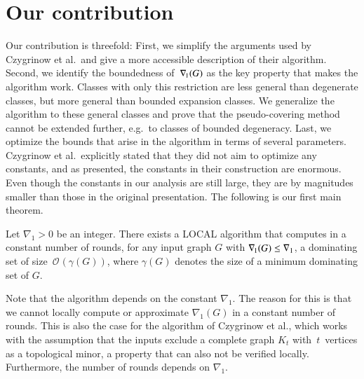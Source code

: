 \section{Our contribution}
Our contribution is threefold:
First, we simplify the
arguments used by Czygrinow et al.\ and give a  more accessible
description of their algorithm.
Second, we identify the boundedness of~$\nabla_{\hspace{-1pt}1}(G)$ as the key property that makes the algorithm
work. Classes with only this restriction are less general than degenerate classes, but
 more general than bounded expansion classes.
 We generalize the algorithm to these general classes
 and prove that the pseudo-covering method cannot
be extended further, e.g.\ to classes of bounded degeneracy.
Last, we optimize the bounds that arise in
the algorithm in terms of several parameters.
Czygrinow et al.\ explicitly stated that they did not aim to
optimize any constants, and as presented, the constants in their
construction are enormous.
%
Even though the constants in our analysis
are still large, they are by magnitudes smaller than those in the
original presentation. The following is our first main theorem.

\begin{theorem}\label{thm:main-general}
Let $\nabla_1>0$ be an integer.
There exists a LOCAL algorithm that computes  in a constant number of rounds, for any input graph $G$ with $\nabla_{\hspace{-1pt}1}(G)\le \nabla_1$, a dominating set
of size~$\mathcal{O}\hspace{1pt}(\gamma(G))$, where
$\gamma(G)$ denotes the size of a minimum dominating set of $G$.
\end{theorem}


Note that the algorithm depends on the constant $\nabla_1$.
The reason for this is that we cannot locally compute or approximate
$\nabla_1(G)$
in a constant number of rounds. This is also
the case for the algorithm of Czygrinow et al., which works with the
assumption that the inputs exclude a complete graph $K_t$ with~$t$~vertices
as a topological minor, a property that can also not be verified locally.
Furthermore, the number of rounds depends on $\nabla_1$.


